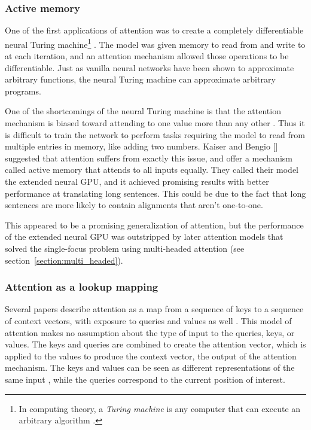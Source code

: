 \documentclass{article}
\begin{document}
\subsubsection{Active memory}

One of the first applications of attention was to create a completely differentiable neural Turing machine\footnote{In computing theory, a \textit{Turing machine} is any computer that can execute an arbitrary algorithm \cite{wiki:turing}.} \cite{neural_turing}. The model was given memory to read from and write to at each iteration, and an attention mechanism allowed those operations to be differentiable. Just as vanilla neural networks have been shown to approximate arbitrary functions, the neural Turing machine can approximate arbitrary programs.

One of the shortcomings of the neural Turing machine is that the attention mechanism is biased toward attending to one value more than any other \cite{active_memory}. Thus it is difficult to train the network to perform tasks requiring the model to read from multiple entries in memory, like adding two numbers. Kaiser and Bengio [\citeyear{active_memory}] suggested that attention suffers from exactly this issue, and offer a mechanism called active memory that attends to all inputs equally. They called their model the extended neural GPU, and it achieved promising results with better performance at translating long sentences. This could be due to the fact that long sentences are more likely to contain alignments that aren't one-to-one.

This appeared to be a promising generalization of attention, but the performance of the extended neural GPU was outstripped by later attention models that solved the single-focus problem using multi-headed attention \cite{attn_all_you_need} (see section~\ref{section:multi_headed}).

\subsubsection{Attention as a lookup mapping}

Several papers describe attention as a map from a sequence of keys to a sequence of context vectors, with exposure to queries and values as well \cite{attn_all_you_need,attention_please}. This model of attention makes no assumption about the type of input to the queries, keys, or values. The keys and queries are combined to create the attention vector, which is applied to the values to produce the context vector, the output of the attention mechanism. The keys and values can be seen as different representations of the same input \cite{attention_please}, while the queries correspond to the current position of interest.
\end{document}
